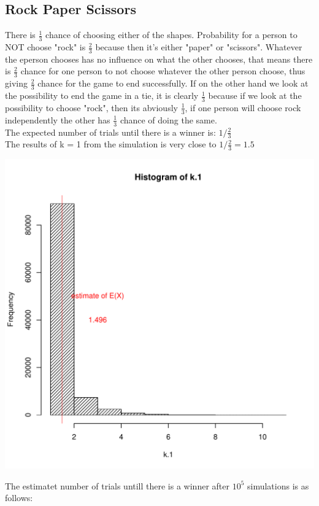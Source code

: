 \documentclass[a4paper, 11pt]{article}
\begin{document}
\subsection*{Rock Paper Scissors}
There is $\frac{1}{3}$ chance of choosing either of the shapes. Probability for a person to NOT choose "rock" is $\frac{2}{3}$ because then it's either "paper" or "scissors". Whatever the eperson chooses has no influence on what the other chooses, that means there is $\frac{2}{3}$ chance for one person to not choose whatever the other person choose, thus giving $\frac{2}{3}$ chance for the game to end successfully. If on the other hand we look at the possibility to end the game in a tie, it is clearly $\frac{1}{3}$ because if we look at the possibility to choose "rock", then its abviously $\frac{1}{3}$, if one person will choose rock independently the other has $\frac{1}{3}$ chance of doing the same.\\
The expected number of trials until there is a winner is:
$ 1/\frac{2}{3}  $\\
The results of k = 1 from the simulation is very close to $ 1/\frac{2}{3} =1.5 $
\begin{center}
  \includegraphics[scale=0.7,page=1]{Rplots.pdf}
\end{center}

\newpage
The estimatet number of trials untill there is a winner after $10^5$ simulations is as follows:
\end{document}
